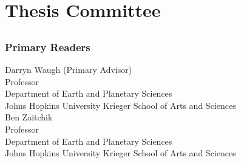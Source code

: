 \chapter*{Thesis Committee}

\section*{}
\subsection*{Primary Readers}

\begin{singlespace}


\indent Darryn Waugh (Primary Advisor)\\
\indent \indent Professor \\
\indent \indent Department of Earth and Planetary Sciences\\
\indent \indent  Johns Hopkins University Krieger School of Arts and  Sciences \\
\smallskip
Ben Zaitchik\\
\indent \indent Professor \\
\indent \indent Department of Earth and Planetary Sciences\\
\indent \indent  Johns Hopkins University Krieger School of Arts and  Sciences \\



%
%
%
%
%

\end{singlespace}
%

